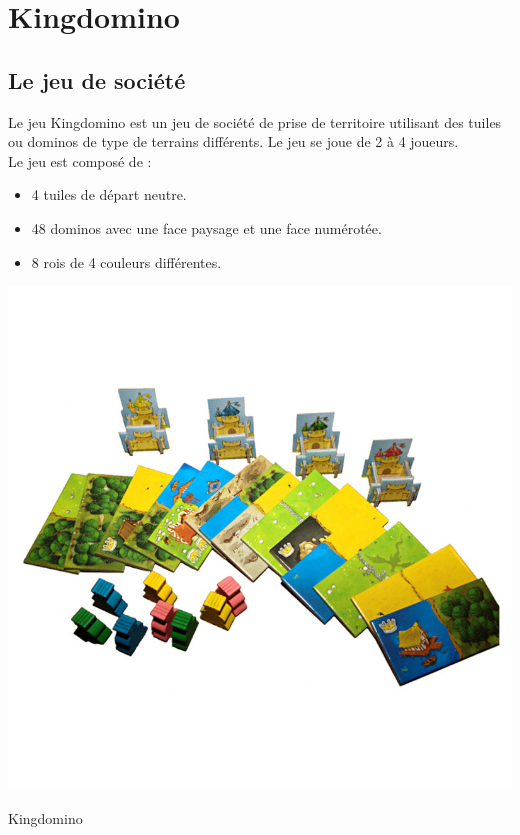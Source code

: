 
\chapter{Kingdomino} %

\label{Chapter2} %

\section{Le jeu de société}
Le jeu Kingdomino est un jeu de société de prise de territoire utilisant des tuiles ou dominos de type de terrains différents. Le jeu se joue de 2 à 4 joueurs.\\
Le jeu est composé de :
\begin{itemize}
    \item 4 tuiles de départ neutre.
    \item 48 dominos avec une face paysage et une face numérotée.
    \item 8 rois de 4 couleurs différentes.
\end{itemize}

\begin{center}
  \includegraphics[scale=0.5]{Figures/jeuking}
  \caption{Kingdomino}
\end{center}

